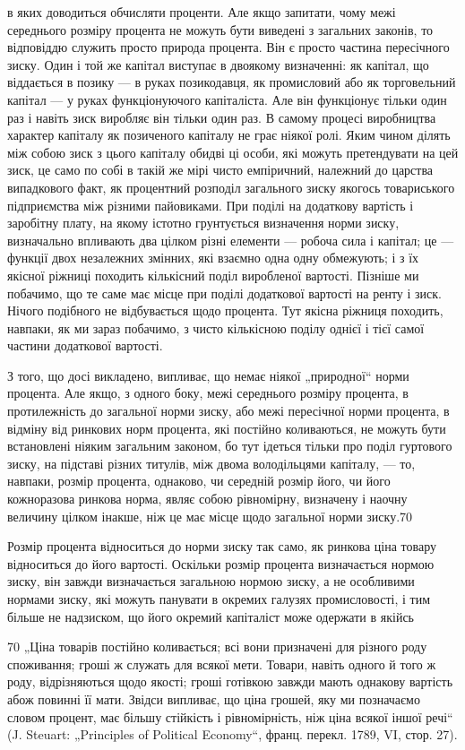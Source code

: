 в яких доводиться обчисляти проценти. Але якщо запитати, чому
межі середнього розміру процента не можуть бути виведені
з загальних законів, то відповіддю служить просто природа процента.
Він є просто частина пересічного зиску. Один і той же
капітал виступає в двоякому визначенні: як капітал, що віддається
в позику — в руках позикодавця, як промисловий або як
торговельний капітал — у руках функціонуючого капіталіста. Але
він функціонує тільки один раз і навіть зиск виробляє він тільки
один раз. В самому процесі виробництва характер капіталу як
позиченого капіталу не грає ніякої ролі. Яким чином ділять
між собою зиск з цього капіталу обидві ці особи, які можуть
претендувати на цей зиск, це само по собі в такій же мірі чисто
емпіричний, належний до царства випадкового факт, як процентний
розподіл загального зиску якогось товариського підприємства
між різними пайовиками. При поділі на додаткову вартість
і заробітну плату, на якому істотно грунтується визначення
норми зиску, визначально впливають два цілком різні елементи —
робоча сила і капітал; це — функції двох незалежних змінних, які
взаємно одна одну обмежують; і з їх якісної ріжниці походить
кількісний поділ виробленої вартості. Пізніше ми побачимо, що
те саме має місце при поділі додаткової вартості на ренту і зиск.
Нічого подібного не відбувається щодо процента. Тут якісна
ріжниця походить, навпаки, як ми зараз побачимо, з чисто кількісною
поділу однієї і тієї самої частини додаткової вартості.

З того, що досі викладено, випливає, що немає ніякої „природної“
норми процента. Але якщо, з одного боку, межі середнього
розміру процента, в протилежність до загальної норми зиску,
або межі пересічної норми процента, в відміну від ринкових
норм процента, які постійно коливаються, не можуть бути встановлені
ніяким загальним законом, бо тут ідеться тільки про
поділ гуртового зиску, на підставі різних титулів, між двома володільцями
капіталу, — то, навпаки, розмір процента, однаково,
чи середній розмір його, чи його кожноразова ринкова норма,
являє собою рівномірну, визначену і наочну величину цілком
інакше, ніж це має місце щодо загальної норми зиску.70

Розмір процента відноситься до норми зиску так само, як ринкова
ціна товару відноситься до його вартості. Оскільки розмір
процента визначається нормою зиску, він завжди визначається
загальною нормою зиску, а не особливими нормами зиску, які
можуть панувати в окремих галузях промисловості, і тим більше
не надзиском, що його окремий капіталіст може одержати в якійсь

70 „Ціна товарів постійно коливається; всі вони призначені для різного роду
споживання; гроші ж служать для всякої мети. Товари, навіть одного й того ж
роду, відрізняються щодо якості; гроші готівкою завжди мають однакову вартість
абож повинні її мати. Звідси випливає, що ціна грошей, яку ми позначаємо
словом процент, має більшу стійкість і рівномірність, ніж ціна всякої
іншої речі“ (J. Steuart: „Principles of Political Economy“, франц. перекл. 1789,
VI, стор. 27).
